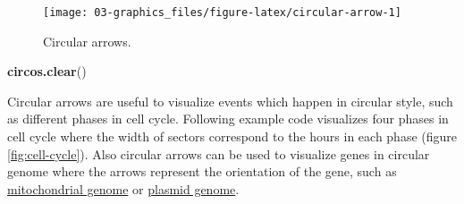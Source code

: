 \documentclass[]{book}
\newenvironment{Shaded}{\begin{snugshade}}{\end{snugshade}}
\newcommand{\KeywordTok}[1]{\textcolor[rgb]{0.13,0.29,0.53}{\textbf{#1}}}
\newcommand{\DataTypeTok}[1]{\textcolor[rgb]{0.13,0.29,0.53}{#1}}
\newcommand{\DecValTok}[1]{\textcolor[rgb]{0.00,0.00,0.81}{#1}}
\newcommand{\FloatTok}[1]{\textcolor[rgb]{0.00,0.00,0.81}{#1}}
\newcommand{\StringTok}[1]{\textcolor[rgb]{0.31,0.60,0.02}{#1}}
\newcommand{\OtherTok}[1]{\textcolor[rgb]{0.56,0.35,0.01}{#1}}
\newcommand{\ControlFlowTok}[1]{\textcolor[rgb]{0.13,0.29,0.53}{\textbf{#1}}}
\newcommand{\OperatorTok}[1]{\textcolor[rgb]{0.81,0.36,0.00}{\textbf{#1}}}
\newcommand{\NormalTok}[1]{#1}
\begin{document}
\begin{Shaded}
\end{Shaded}

\begin{figure}

{\centering \texttt{[image: 03-graphics\_files/figure-latex/circular-arrow-1]} 

}

\caption{Circular arrows.}\label{fig:circular-arrow}
\end{figure}

\begin{Shaded}
\begin{Highlighting}[]
\KeywordTok{circos.clear}\NormalTok{()}
\end{Highlighting}
\end{Shaded}

Circular arrows are useful to visualize events which happen in circular
style, such as different phases in cell cycle. Following example code
visualizes four phases in cell cycle where the width of sectors
correspond to the hours in each phase (figure \ref{fig:cell-cycle}).
Also circular arrows can be used to visualize genes in circular genome
where the arrows represent the orientation of the gene, such as
\href{https://en.wikipedia.org/wiki/Mitochondrial_DNA}{mitochondrial
genome} or \href{https://en.wikipedia.org/wiki/Plasmid}{plasmid genome}.
\end{document}
